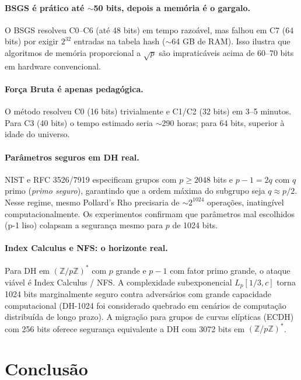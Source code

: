 \documentclass[conference, onecolumn]{IEEEtran}
\begin{document}
\paragraph{BSGS é prático até $\sim$50 bits, depois a memória é o gargalo.}
O BSGS resolveu C0--C6 (até 48 bits) em tempo razoável, mas falhou em C7 (64 bits) por
exigir $2^{32}$ entradas na tabela hash ($\sim$64 GB de RAM). Isso ilustra que algoritmos
de memória proporcional a $\sqrt{p}$ são impraticáveis acima de 60--70 bits em hardware
convencional.

\paragraph{Força Bruta é apenas pedagógica.}
O método resolveu C0 (16 bits) trivialmente e C1/C2 (32 bits) em 3--5 minutos. Para
C3 (40 bits) o tempo estimado seria $\sim$290 horas; para 64 bits, superior à idade
do universo.

\paragraph{Parâmetros seguros em DH real.}
NIST e RFC 3526/7919 especificam grupos com $p \geq 2048$ bits e $p-1 = 2q$ com $q$
primo (\emph{primo seguro}), garantindo que a ordem máxima do subgrupo seja $q \approx p/2$.
Nesse regime, mesmo Pollard's Rho precisaria de $\sim 2^{1024}$ operações, inatingível
computacionalmente. Os experimentos confirmam que parâmetros mal escolhidos (p-1 liso)
colapsam a segurança mesmo para $p$ de 1024 bits.

\paragraph{Index Calculus e NFS: o horizonte real.}
Para DH em $(\mathbb{Z}/p\mathbb{Z})^*$ com $p$ grande e $p-1$ com fator primo grande,
o ataque viável é Index Calculus / NFS. A complexidade subexponencial
$L_p[1/3, c]$ torna 1024 bits marginalmente seguro contra adversários com grande
capacidade computacional (DH-1024 foi considerado quebrado em cenários de computação
distribuída de longo prazo). A migração para grupos de curvas elípticas (ECDH) com 256
bits oferece segurança equivalente a DH com 3072 bits em $(\mathbb{Z}/p\mathbb{Z})^*$.

\section*{Conclusão}
\end{document}
